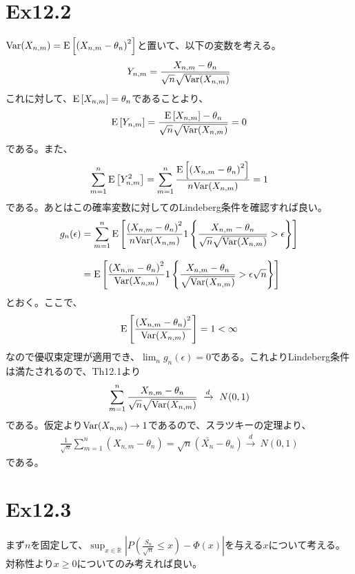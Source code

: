 \documentclass{article}
\begin{document}
\section{Ex12.2}
${\rm Var}(X_{n,m}) = {\rm E}\left[ \left( X_{n,m} - \theta_n \right)^2 \right]$と置いて、以下の変数を考える。
\begin{align*}
	Y_{n,m} = \frac{X_{n,m} - \theta_n}{\sqrt{n} \sqrt{{\rm Var}(X_{n,m})}}
\end{align*}
これに対して、${\rm E}\left[ X_{n,m} \right] = \theta_n$であることより、
\begin{align*}
	{\rm E}\left[ Y_{n,m} \right] = \frac{{\rm E}\left[ X_{n,m} \right] - \theta_n}{\sqrt{n} \sqrt{{\rm Var}(X_{n,m})}} = 0
\end{align*}
である。また、
\begin{align*}
	 \sum_{m=1}^n{\rm E}\left[ Y_{n,m}^2 \right] =\sum_{m=1}^n \frac{{\rm E}\left[ \left( X_{n,m} - \theta_n \right)^2 \right]}{n{\rm Var}(X_{n,m})} = 1
\end{align*}
である。あとはこの確率変数に対してのLindeberg条件を確認すれば良い。
\begin{align*}
	g_n(\epsilon) &= \sum_{m=1}^n {\rm E} \left[ \frac{ \left( X_{n,m} - \theta_n \right)^2}{n{\rm Var}(X_{n,m})} 1\left\{  \frac{X_{n,m} - \theta_n}{\sqrt{n} \sqrt{{\rm Var}(X_{n,m})}} > \epsilon \right\} \right]\\[8pt]
	&= {\rm E}\left[  \frac{ \left( X_{n,m} - \theta_n \right)^2}{{\rm Var}(X_{n,m})} 1\left\{  \frac{X_{n,m} - \theta_n}{\sqrt{{\rm Var}(X_{n,m})}} > \epsilon \sqrt{n} \right\} \right]
\end{align*}
とおく。ここで、
\begin{align*}
	{\rm E}\left[  \frac{ \left( X_{n,m} - \theta_n \right)^2}{{\rm Var}(X_{n,m})}  \right] = 1 < \infty
\end{align*}
なので優収束定理が適用でき、$\lim_n g_n(\epsilon) = 0$である。これよりLindeberg条件は満たされるので、Th12.1より
\begin{align*}
	\sum_{m=1}^n \frac{X_{n,m} - \theta_n}{\sqrt{n} \sqrt{{\rm Var}(X_{n,m})}}\ \xrightarrow{d}\ N(0,1)
\end{align*}
である。仮定より${\rm Var}(X_{n,m}) \to 1$であるので、スラツキーの定理より、
\begin{align*}
	\frac{1}{\sqrt{n}} \sum_{m=1}^n (X_{n,m} - \theta_n) = \sqrt{n} (\bar{X_n} - \theta_n) \xrightarrow{d}\ N(0,1)
\end{align*}
である。

\section{Ex12.3}
まず$n$を固定して、$\sup_{x\in \mathbb{R}} \left| P\left( \frac{S_n}{\sqrt{n}} \leq x \right) - \Phi(x) \right|$を与える$x$について考える。対称性より$x \geq 0$についてのみ考えれば良い。
\end{document}
